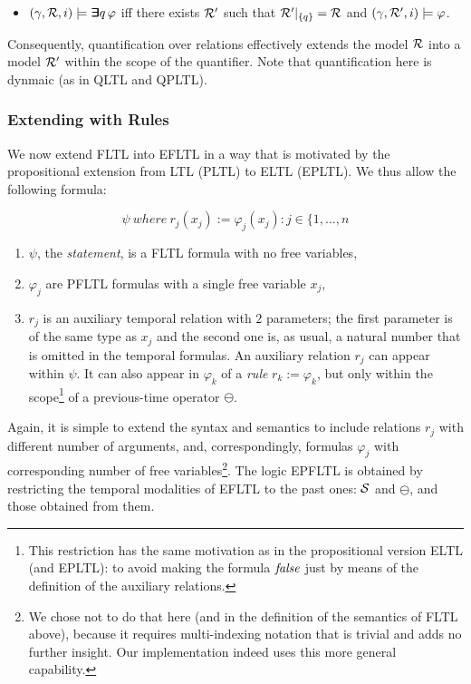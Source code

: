 
\begin{itemize}
\item $(\gamma ,  {\cal R}, i) \models \bm{\exists}\kern-0.6em\bm{\exists} q \, \varphi$ iff there exists
${\cal R}'$ such that ${\cal R}' |_{\{ q \} } = {\cal R}$ and 
$( \gamma, {\cal R}' , i) \models \varphi$.
\end{itemize}
Consequently, quantification over relations effectively extends the model ${\cal R}$ into a model ${\cal R}'$ within the scope of the quantifier. Note that quantification here is dynmaic (as in QLTL and QPLTL).

\subsubsection{Extending with Rules}

We now extend FLTL into EFLTL in a way that is motivated by the  propositional extension from LTL (PLTL) to ELTL (EPLTL). We thus allow the following formula:

\begin{equation}
\label{EFLTL}
\psi \mathit{\ where\ } r_j  ( x_j ) := 
\varphi_j (x_j) : j \in \{ 1 , \ldots , n 
\end{equation}

\begin{enumerate}
\item $\psi$, the {\em statement}, is a FLTL formula with
no free variables, 
\item $\varphi_j$ are PFLTL formulas with a single
free variable $x_j$,
\item $r_j$ is an auxiliary temporal relation with $2$ parameters; the first parameter is of the same 
type as $x_j$ and the second one is, as usual,
a natural number that is omitted in the temporal formulas. 
An auxiliary relation $r_j$ can appear within $\psi$. It can also appear in $\varphi_k$ of a {\em rule} $r_k := \varphi_k$, but only within the
scope\footnote{This restriction has the same motivation as in
the propositional version ELTL (and EPLTL): to avoid making the
formula $\mathit{false}$ just by means of the definition of the auxiliary relations.}
of a previous-time operator $\ominus$. 
\end{enumerate}


Again, it
is simple to extend the syntax and semantics to include
relations $r_j$ with different number of arguments, and, correspondingly, formulas $\varphi_j$ with corresponding number of free
variables\footnote{We chose not to do that here (and in the definition of the semantics of FLTL above), because it
requires multi-indexing notation that is trivial and adds no further insight. Our implementation indeed uses
this more general capability.}.
The logic EPFLTL is obtained by restricting the temporal modalities of EFLTL to the past ones:
${\cal S}$ and $\ominus$, and those obtained from them.

